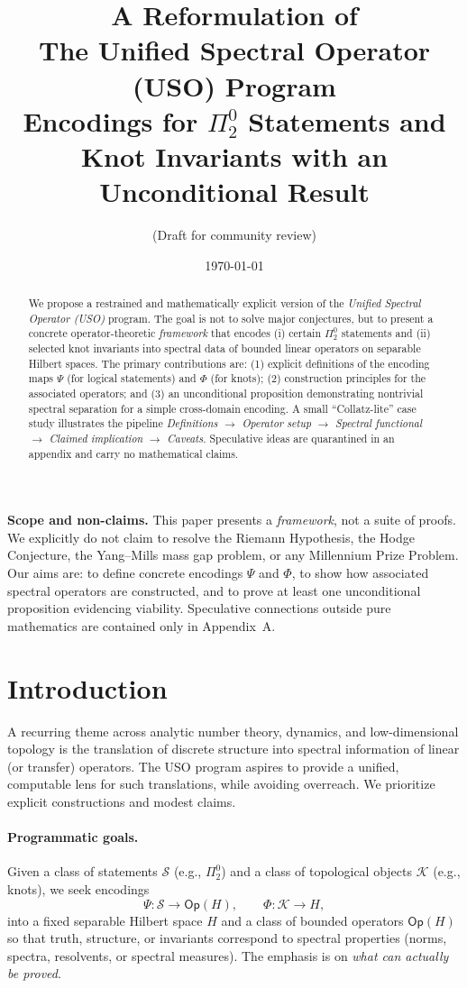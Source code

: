 \documentclass[11pt]{article}
\title{A Reformulation of  \\ The Unified Spectral Operator (USO) Program\\\large Encodings for $\Pi^0_2$ Statements and Knot Invariants with an Unconditional Result}
\author{(Draft for community review)}
\date{\today}
\theoremstyle{definition}
\theoremstyle{remark}
\newcommand{\1}{\mathbf{1}}
\begin{document}
\maketitle

\begin{abstract}
We propose a restrained and mathematically explicit version of the \emph{Unified Spectral Operator (USO)} program. The goal is not to solve major conjectures, but to present a concrete operator-theoretic \emph{framework} that encodes (i) certain $\Pi^0_2$ statements and (ii) selected knot invariants into spectral data of bounded linear operators on separable Hilbert spaces. The primary contributions are: (1) explicit definitions of the encoding maps $\Psi$ (for logical statements) and $\Phi$ (for knots); (2) construction principles for the associated operators; and (3) an unconditional proposition demonstrating nontrivial spectral separation for a simple cross-domain encoding. A small ``Collatz-lite'' case study illustrates the pipeline \emph{Definitions $\to$ Operator setup $\to$ Spectral functional $\to$ Claimed implication $\to$ Caveats}. Speculative ideas are quarantined in an appendix and carry no mathematical claims.
\end{abstract}

\begin{tcolorbox}
\textbf{Scope and non-claims.} This paper presents a \emph{framework}, not a suite of proofs. We explicitly do not claim to resolve the Riemann Hypothesis, the Hodge Conjecture, the Yang--Mills mass gap problem, or any Millennium Prize Problem. Our aims are: to define concrete encodings $\Psi$ and $\Phi$, to show how associated spectral operators are constructed, and to prove at least one unconditional proposition evidencing viability. Speculative connections outside pure mathematics are contained only in Appendix~A.
\end{tcolorbox}

\section{Introduction}
A recurring theme across analytic number theory, dynamics, and low-dimensional topology is the translation of discrete structure into spectral information of linear (or transfer) operators. The USO program aspires to provide a unified, computable lens for such translations, while avoiding overreach. We prioritize explicit constructions and modest claims.

\paragraph{Programmatic goals.} Given a class of statements $\mathcal{S}$ (e.g., $\Pi^0_2$) and a class of topological objects $\mathcal{K}$ (e.g., knots), we seek encodings
\[
  \Psi: \mathcal{S} \to \mathsf{Op}(H),\qquad \Phi: \mathcal{K} \to H,
\]
into a fixed separable Hilbert space $H$ and a class of bounded operators $\mathsf{Op}(H)$ so that truth, structure, or invariants correspond to spectral properties (norms, spectra, resolvents, or spectral measures). The emphasis is on \emph{what can actually be proved}.
\end{document}
